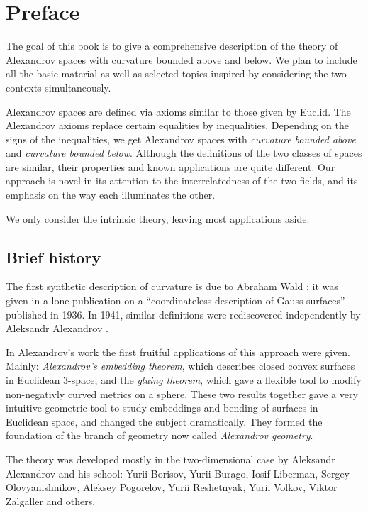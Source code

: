 \chapter*{Preface}

The goal of this book is to give a comprehensive description of the theory of Alexandrov spaces 
with curvature bounded above and below.
We plan to include all the basic material as well as selected topics inspired by considering the two contexts simultaneously.

Alexandrov spaces are defined via axioms similar to those given by Euclid.
The Alexandrov axioms replace certain  equalities by inequalities. 
Depending on the signs of the inequalities, we get Alexandrov spaces with \emph{curvature bounded above} and \emph{curvature bounded below}.
Although the definitions of the two classes of spaces are similar, their properties and known applications are quite different.
Our approach is novel in its attention to the interrelatedness of the two fields, and its emphasis on the way each illuminates the other.

We only consider  the intrinsic theory, leaving most applications aside.


\section*{Brief history}

The first synthetic description of curvature is due to Abraham Wald \cite{wald}; 
it was given in a lone publication on a ``coordinateless description of Gauss surfaces'' published in 1936.
In 1941, similar definitions were rediscovered independently by Aleksandr Alexandrov \cite{alexandrov:def}.

In Alexandrov's work the first fruitful applications of this approach were given.
Mainly: \emph{Alexandrov's embedding theorem}, which describes closed convex surfaces in Euclidean 3-space,
and the \emph{gluing theorem}, which gave a flexible tool to modify non-negativly curved metrics on a sphere.
These two results together gave  a very intuitive geometric tool to study embeddings and bending of surfaces in Euclidean space, and changed the subject dramatically.
They formed the foundation of the branch of geometry now called \emph{Alexandrov geometry}.


The theory was developed mostly in the two-dimensional case 
by Aleksandr Alexandrov
and his school:  
Yurii  Borisov,
Yurii  Burago,
Iosif  Liberman,
Sergey  Olovyanishnikov,
Aleksey  Pogorelov,
Yurii  Reshetnyak,
Yurii  Volkov,
Viktor  Zalgaller and others.

